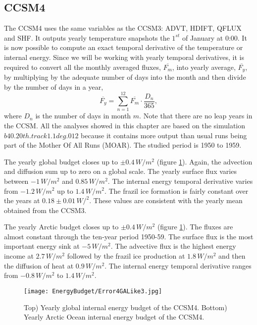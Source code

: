\subsection{CCSM4}\label{c4}

The CCSM4 uses the same variables as the CCSM3: ADVT, HDIFT, QFLUX and SHF. It outputs yearly temperature snapshots the $1^{st}$ of January at 0:00. It is now possible to compute an exact temporal derivative of the temperature or internal energy. Since we will be working with yearly temporal derivatives, it is required to convert all the monthly averaged fluxes, $\overline{F_m}$, into yearly average, $\overline{F_y}$, by multiplying by the adequate number of days into the month and then divide by the number of days in a year,
\begin{equation}
\overline{F_y} = \sum_{n=1}^{12} \overline{F_m} \cdot \frac{D_n}{365},
\end{equation}
where $D_n$ is the number of days in month $m$. Note that there are no leap years in the CCSM. All the analyses showed in this chapter are based on the simulation $b40.20th.track1.1deg.012$ because it contains more output than usual runs being part of the Mother Of All Runs (MOAR). The studied period is 1950 to 1959. 

The yearly global budget closes up to $\pm 0.4 \, W/m^2$ (figure \ref{err4l3}). Again, the advection and diffusion sum up to zero on a global scale. The yearly surface flux varies between $-1 \, W/m^2$ and $0.85 \, W/m^2$. The internal energy temporal derivative varies from $-1.2 \, W/m^2$ up to $1.4 \, W/m^2$. The frazil ice formation is fairly constant over the years at $0.18 \pm 0.01 \, W/^2$. These values are consistent with the yearly mean obtained from the CCSM3.

The yearly Arctic budget closes up to $\pm 0.4 \, W/m^2$ (figure \ref{err4l3}). The fluxes are almost constant through the ten-year period 1950-59. The surface flux is the most important energy sink at $-5 \, W/m^2$. The advective flux is the highest energy income at $2.7 \, W/m^2$ followed by the frazil ice production at $1.8 \, W/m^2$ and then the diffusion of heat at $0.9 \, W/m^2$. The internal energy temporal derivative ranges from $-0.8 \, W/m^2$ to $1.4 \, W/m^2$. 

\begin{figure}
\center
\texttt{[image: EnergyBudget/Error4GALike3.jpg]}
\caption{Top) Yearly global internal energy budget of the CCSM4. Bottom) Yearly Arctic Ocean internal energy budget of the CCSM4.}
\label{err4l3}
\end{figure}

